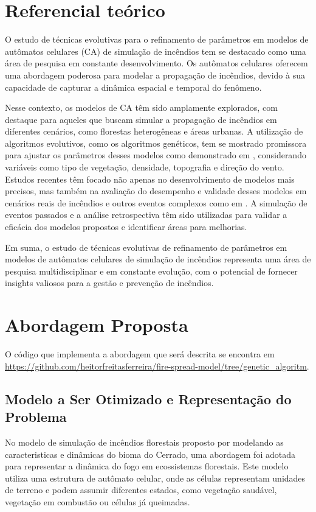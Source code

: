 \documentclass[12pt]{article}
\begin{document}
\section{Referencial teórico} \label{sec:firstpage}
O estudo de técnicas evolutivas para o refinamento de parâmetros em modelos de autômatos celulares (CA) de simulação de incêndios tem se destacado como uma área de pesquisa em constante desenvolvimento. Os autômatos celulares oferecem uma abordagem poderosa para modelar a propagação de incêndios, devido à sua capacidade de capturar a dinâmica espacial e temporal do fenômeno.

Nesse contexto, os modelos de CA têm sido amplamente explorados, com destaque para aqueles que buscam simular a propagação de incêndios em diferentes cenários, como florestas heterogêneas e áreas urbanas. A utilização de algoritmos evolutivos, como os algoritmos genéticos, tem se mostrado promissora para ajustar os parâmetros desses modelos como demonstrado em \cite{shan2008genetic}, considerando variáveis como tipo de vegetação, densidade, topografia e direção do vento.
Estudos recentes têm focado não apenas no desenvolvimento de modelos mais precisos, mas também na avaliação do desempenho e validade desses modelos em cenários reais de incêndios e outros eventos complexos como em \cite{dias2018calibrating}. A simulação de eventos passados e a análise retrospectiva têm sido utilizadas para validar a eficácia dos modelos propostos e identificar áreas para melhorias.

Em suma, o estudo de técnicas evolutivas de refinamento de parâmetros em modelos de autômatos celulares de simulação de incêndios representa uma área de pesquisa multidisciplinar e em constante evolução, com o potencial de fornecer insights valiosos para a gestão e prevenção de incêndios.

\section{Abordagem Proposta}

O código que implementa a abordagem que será descrita se encontra em \url {https://github.com/heitorfreitasferreira/fire-spread-model/tree/genetic_algoritm}.

\subsection{Modelo a Ser Otimizado e Representação do Problema}
No modelo de simulação de incêndios florestais proposto por \cite{ferreira2023stochastic} modelando as caracteristicas e dinâmicas do bioma do Cerrado, uma abordagem foi adotada para representar a dinâmica do fogo em ecossistemas florestais. Este modelo utiliza uma estrutura de autômato celular, onde as células representam unidades de terreno e podem assumir diferentes estados, como vegetação saudável, vegetação em combustão ou células já queimadas.
\end{document}
